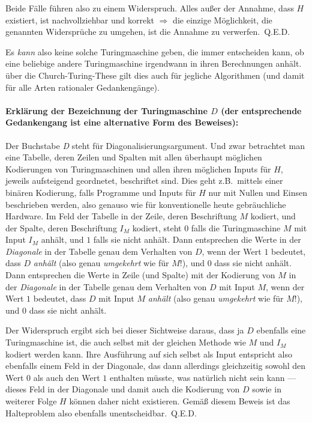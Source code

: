 \noindent Beide Fälle führen also zu einem Widerspruch. Alles außer der Annahme, dass $H$ existiert, ist nachvollziehbar und korrekt $\Rightarrow$ die einzige Möglichkeit, die genannten Widersprüche zu umgehen, ist die Annahme zu verwerfen.~Q.E.D.\newline

\noindent Es \emph{kann} also keine solche Turingmaschine geben, die immer entscheiden kann, ob eine beliebige andere Turingmaschine irgendwann in ihren Berechnungen anhält. über die Church-Turing-These gilt dies auch für jegliche Algorithmen (und damit für alle Arten rationaler Gedankengänge).

\paragraph{Erklärung der Bezeichnung der Turingmaschine $D$ (der entsprechende Gedankengang ist eine alternative Form des Beweises):} Der Buchstabe \emph{D} steht für Diagonalisierungsargument. Und zwar betrachtet man eine Tabelle, deren Zeilen und Spalten mit allen überhaupt möglichen Kodierungen von Turingmaschinen und allen ihren möglichen Inputs für $H$, je\-weils aufsteigend geordnetet, beschriftet sind. Dies geht z.B.\ mittels einer binären Kodierung, falls Programme und Inputs für $H$ nur mit Nullen und Einsen beschrieben werden, also genauso wie für konventionelle heute gebräuchliche Hardware. Im Feld der Tabelle in der Zeile, deren Beschriftung $M$ kodiert, und der Spalte, deren Beschriftung $I_M$ kodiert, steht $0$ falls die Turingmaschine $M$ mit Input $I_M$ anhält, und $1$ falls sie nicht anhält. Dann entsprechen die Werte in der \emph{Diagonale} in der Tabelle genau dem Verhalten von $D$, wenn der Wert $1$ bedeutet, dass $D$ \emph{anhält} (also genau \emph{umgekehrt} wie für $M$!), und $0$ dass sie nicht anhält. Dann entsprechen die Werte in Zeile (und Spalte) mit der Kodierung von $M$ in der \emph{Diagonale} in der Tabelle genau dem Verhalten von $D$ mit Input $M$, wenn der Wert $1$ bedeutet, dass $D$ mit Input $M$ \emph{anhält} (also genau \emph{umgekehrt} wie für $M$!), und $0$ dass sie nicht anhält.

Der Widerspruch ergibt sich bei dieser Sichtweise daraus, dass ja $D$ ebenfalls eine Tu\-ringmaschine ist, die auch selbst mit der gleichen Methode wie $M$ und $I_M$ kodiert werden kann. Ihre Ausführung auf sich selbst als Input entspricht also ebenfalls einem Feld in der Diagonale, das dann allerdings gleichzeitig sowohl den Wert $0$ als auch den Wert $1$ enthalten müsste, was natürlich nicht sein kann --- dieses Feld in der Diagonale und damit auch die Kodierung von $D$ sowie in weiterer Folge $H$ können daher nicht existieren. Gemäß diesem Beweis ist das Halteproblem also ebenfalls unentscheidbar.~Q.E.D.

